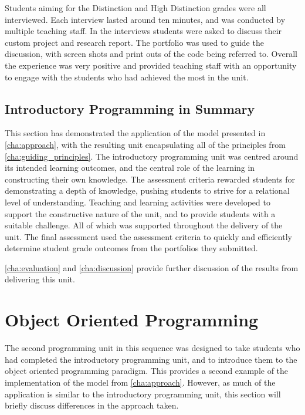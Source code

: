 Students aiming for the Distinction and High Distinction grades were all interviewed. Each interview lasted around ten minutes, and was conducted by multiple teaching staff. In the interviews students were asked to discuss their custom project and research report. The portfolio was used to guide the discussion, with screen shots and print outs of the code being referred to. Overall the experience was very positive and provided teaching staff with an opportunity to engage with the students who had achieved the most in the unit.


\subsection{Introductory Programming in Summary} %
\label{sub:intro_summary}

This section has demonstrated the application of the model presented in \cref{cha:approach}, with the resulting unit encapsulating all of the principles from \cref{cha:guiding_principles}. The introductory programming unit was centred around its intended learning outcomes, and the central role of the learning in constructing their own knowledge. The assessment criteria rewarded students for demonstrating a depth of knowledge, pushing students to strive for a relational level of understanding. Teaching and learning activities were developed to support the constructive nature of the unit, and to provide students with a suitable challenge. All of which was supported throughout the delivery of the unit. The final assessment used the assessment criteria to quickly and efficiently determine student grade outcomes from the portfolios they submitted. 

\cref{cha:evaluation} and \cref{cha:discussion} provide further discussion of the results from delivering this unit.


\clearpage
\section{Object Oriented Programming} %
\label{sec:object_oriented_programming}

The second programming unit in this sequence was designed to take students who had completed the introductory programming unit, and to introduce them to the object oriented programming paradigm. This provides a second example of the implementation of the model from \cref{cha:approach}. However, as much of the application is similar to the introductory programming unit, this section will briefly discuss differences in the approach taken.

